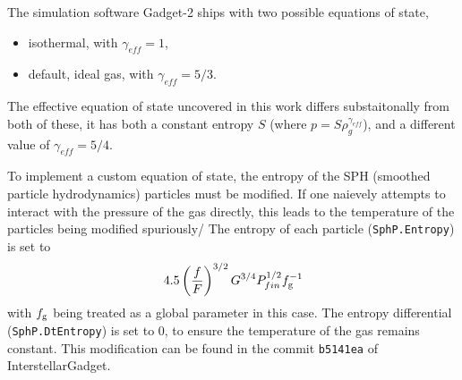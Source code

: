 The simulation software Gadget-2 ships with two possible equations of state,
\begin{itemize}
\item isothermal, with $\gamma_{eff} = 1$,
\item default, ideal gas, with $\gamma_{eff} = 5/3$.
\end{itemize}
The effective equation of state uncovered in this work differs substaitonally from both of these, it has both a constant entropy $S$ (where $p = S\rho_g^{\gamma_{eff}}$), and a different value of $\gamma_{eff} = 5/4$.

To implement a custom equation of state, the entropy of the SPH (smoothed particle hydrodynamics) particles must be modified.
If one naievely attempts to interact with the pressure of the gas directly, this leads to the temperature of the particles being modified spuriously/
The entropy of each particle ({\tt SphP.Entropy}) is set to
$$
4.5\left(\frac{f}{F}\right)^{{3/2}} G^{{3/4}} P_{fin}^{{1/2}} f_\mathrm{g}^{-1}
$$
with $f_\mathrm{g}$ being treated as a global parameter in this case.
The entropy differential ({\tt SphP.DtEntropy}) is set to 0, to ensure the temperature of the gas remains constant.
This modification can be found in the commit {\tt b5141ea} of InterstellarGadget.
